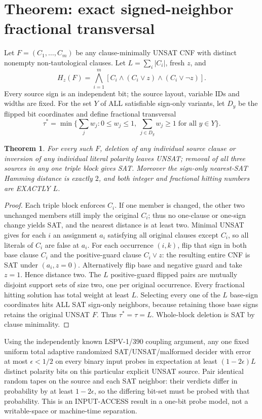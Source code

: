 \documentclass[11pt]{article}
\newtheorem{theorem}{Theorem}
\begin{document}
\section*{Theorem: exact signed-neighbor fractional transversal}
Let $F=(C_1,\dots,C_m)$ be any clause-minimally UNSAT CNF with distinct nonempty non-tautological clauses. Let $L=\sum_i|C_i|$, fresh $z$, and
\[
H_z(F)=\bigwedge_{i=1}^m[C_i\wedge(C_i\vee z)\wedge(C_i\vee\neg z)].
\]
Every source sign is an independent bit; the source layout, variable IDs and widths are fixed. For the set $Y$ of ALL satisfiable sign-only variants, let $D_y$ be the flipped bit coordinates and define fractional transversal
\[
\tau^*=\min\{\sum_jw_j:0\le w_j\le1,\ \sum_{j\in D_y}w_j\ge1\;\text{for all }y\in Y\}.
\]
\begin{theorem}
For every such $F$, deletion of any individual source clause or inversion of any individual literal polarity leaves UNSAT; removal of all three sources in any one triple block gives SAT. Moreover the sign-only nearest-SAT Hamming distance is exactly $2$, and both integer and fractional hitting numbers are EXACTLY $L$.
\end{theorem}
\begin{proof}
Each triple block enforces $C_i$. If one member is changed, the other two unchanged members still imply the original $C_i$; thus no one-clause or one-sign change yields SAT, and the nearest distance is at least two. Minimal UNSAT gives for each $i$ an assignment $a_i$ satisfying all original clauses except $C_i$, so all literals of $C_i$ are false at $a_i$. For each occurrence $(i,k)$, flip that sign in both base clause $C_i$ and the positive-guard clause $C_i\vee z$: the resulting entire CNF is SAT under $(a_i,z=0)$. Alternatively flip base and negative guard and take $z=1$. Hence distance two. The $L$ positive-guard flipped pairs are mutually disjoint support sets of size two, one per original occurrence. Every fractional hitting solution has total weight at least $L$. Selecting every one of the $L$ base-sign coordinates hits ALL SAT sign-only neighbors, because retaining those base signs retains the original UNSAT $F$. Thus $\tau^*=\tau=L$. Whole-block deletion is SAT by clause minimality.
\end{proof}
Using the independently known LSPV-1/390 coupling argument, any one fixed uniform total adaptive randomized SAT/UNSAT/malformed decider with error at most $\epsilon<1/2$ on every binary input probes in expectation at least $(1-2\epsilon)L$ distinct polarity bits on this particular explicit UNSAT source. Pair identical random tapes on the source and each SAT neighbor: their verdicts differ in probability by at least $1-2\epsilon$, so the differing bit-set must be probed with that probability. This is an INPUT-ACCESS result in a one-bit probe model, not a writable-space or machine-time separation.
\end{document}
